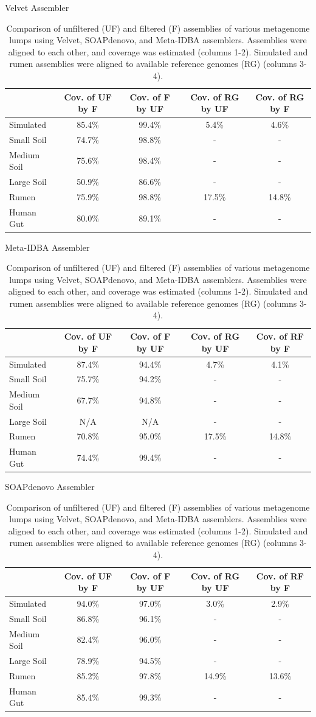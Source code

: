 \documentclass[10pt]{article}
\begin{document}
\begin{table}[ht]
\caption{Comparison of unfiltered (UF) and filtered (F) assemblies of various metagenome lumps using Velvet, SOAPdenovo, and Meta-IDBA assemblers.  Assemblies were aligned to each other, and coverage was estimated (columns 1-2).  Simulated and rumen assemblies were aligned to available reference genomes (RG) (columns 3-4).}


Velvet Assembler  \\
\begin{tabular}{l c c c c}
\hline
& Cov. of UF by F & Cov. of F by UF  & Cov. of RG  by UF  & Cov. of RG by F \\
\hline
Simulated		&85.4\%		&99.4\%		&5.4\%	&4.6\%\\
Small Soil		&74.7\%		&98.8\%		&-		&-\\
Medium Soil	&75.6\%		&98.4\%		&-		&-\\
Large Soil		&50.9\%		&86.6\%		&-		&-\\
Rumen		&75.9\%		&98.8\%		&17.5\%	&14.8\%\\
Human Gut 	&80.0\%		&89.1\%		&-		&-\\
\end{tabular}

\medskip
Meta-IDBA Assembler  \\
\begin{tabular}{l c c c c}
\hline
& Cov. of UF by F & Cov. of F by UF  & Cov. of RG  by UF  & Cov. of RF by F \\
\hline
Simulated		&87.4\%		&94.4\%		&4.7\%	&4.1\%\\
Small Soil		&75.7\%		&94.2\%		&-		&-\\
Medium Soil	&67.7\%		&94.8\%		&-		&-\\
Large Soil		&N/A			&N/A			&-		&-\\
Rumen		&70.8\%		&95.0\%		&17.5\%	&14.8\%\\
Human Gut 	&74.4\%		&99.4\%		&-		&-\\
\end{tabular}

\medskip
SOAPdenovo Assembler \\   
\begin{tabular}{l c c c c}
\hline
& Cov. of UF by F & Cov. of F by UF  & Cov. of RG  by UF  & Cov. of RF by F \\
\hline
Simulated		&94.0\%		&97.0\%		&3.0\%	&2.9\%\\
Small Soil		&86.8\%		&96.1\%		&-		&-\\
Medium Soil	&82.4\%		&96.0\%		&-		&-\\
Large Soil		&78.9\%		&94.5\%		&-		&-\\
Rumen		&85.2\%		&97.8\%		&14.9\%	&13.6\%\\
Human Gut 	&85.4\%		&99.3\%		&-		&-\\
\end{tabular}
\end{table}
\end{document}
